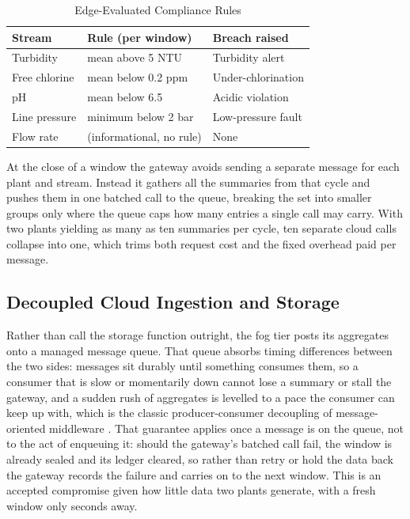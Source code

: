 \documentclass[conference]{IEEEtran}
\begin{document}
\begin{table}[!t]
\caption{Edge-Evaluated Compliance Rules}
\label{tab:rules}
\centering
\renewcommand{\arraystretch}{1.3}
\begin{tabular}{@{}p{}p{}p{}@{}}
\toprule
\textbf{Stream} & \textbf{Rule (per window)} & \textbf{Breach raised} \\
\midrule
Turbidity & mean above 5 NTU & Turbidity alert \\
Free chlorine & mean below 0.2 ppm & Under-chlorination \\
pH & mean below 6.5 & Acidic violation \\
Line pressure & minimum below 2 bar & Low-pressure fault \\
Flow rate & (informational, no rule) & None \\
\bottomrule
\end{tabular}
\end{table}

At the close of a window the gateway avoids sending a separate message for each plant and stream. Instead it gathers all the summaries from that cycle and pushes them in one batched call to the queue, breaking the set into smaller groups only where the queue caps how many entries a single call may carry. With two plants yielding as many as ten summaries per cycle, ten separate cloud calls collapse into one, which trims both request cost and the fixed overhead paid per message.

\subsection{Decoupled Cloud Ingestion and Storage}

Rather than call the storage function outright, the fog tier posts its aggregates onto a managed message queue. That queue absorbs timing differences between the two sides: messages sit durably until something consumes them, so a consumer that is slow or momentarily down cannot lose a summary or stall the gateway, and a sudden rush of aggregates is levelled to a pace the consumer can keep up with, which is the classic producer-consumer decoupling of message-oriented middleware \cite{hohpe2003}. That guarantee applies once a message is on the queue, not to the act of enqueuing it: should the gateway's batched call fail, the window is already sealed and its ledger cleared, so rather than retry or hold the data back the gateway records the failure and carries on to the next window. This is an accepted compromise given how little data two plants generate, with a fresh window only seconds away.
\end{document}
